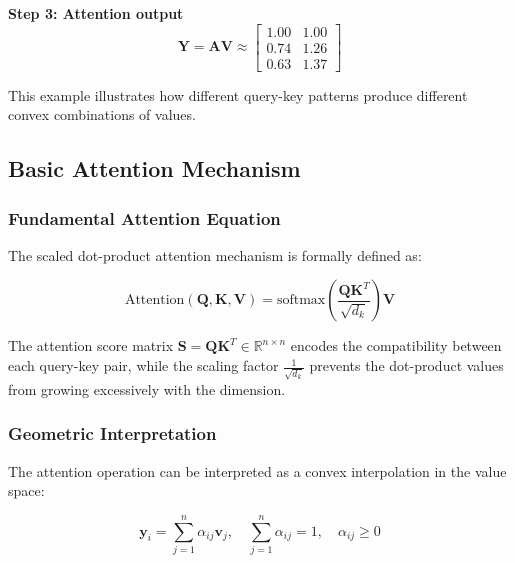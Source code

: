 \begin{example}
    \textbf{Step 3: Attention output}
    \begin{equation}
        \mathbf{Y} = \mathbf{A}\mathbf{V} \approx \begin{bmatrix} 1.00 & 1.00 \\ 0.74 & 1.26 \\ 0.63 & 1.37 \end{bmatrix}
    \end{equation}

    This example illustrates how different query-key patterns produce different convex combinations of values.
\end{example}

\subsection{Basic Attention Mechanism}\label{subsec:atencion_basico}

\subsubsection{Fundamental Attention Equation}

The scaled dot-product attention mechanism is formally defined as:

\begin{equation}
    \text{Attention}(\mathbf{Q}, \mathbf{K}, \mathbf{V}) = \text{softmax}\left(\frac{\mathbf{Q}\mathbf{K}^T}{\sqrt{d_k}}\right)\mathbf{V}
    \label{eq:scaled_dot_product_attention}
\end{equation}

The attention score matrix $\mathbf{S} = \mathbf{Q}\mathbf{K}^T \in \mathbb{R}^{n \times n}$ encodes the compatibility between each query-key pair, while the scaling factor $\frac{1}{\sqrt{d_k}}$ prevents the dot-product values from growing excessively with the dimension.

\subsubsection{Geometric Interpretation}

The attention operation can be interpreted as a convex interpolation in the value space:

\begin{equation}
    \mathbf{y}_i = \sum_{j=1}^{n} \alpha_{ij} \mathbf{v}_j, \quad \sum_{j=1}^{n} \alpha_{ij} = 1, \quad \alpha_{ij} \geq 0
    \label{eq:convex_combination}
\end{equation}

